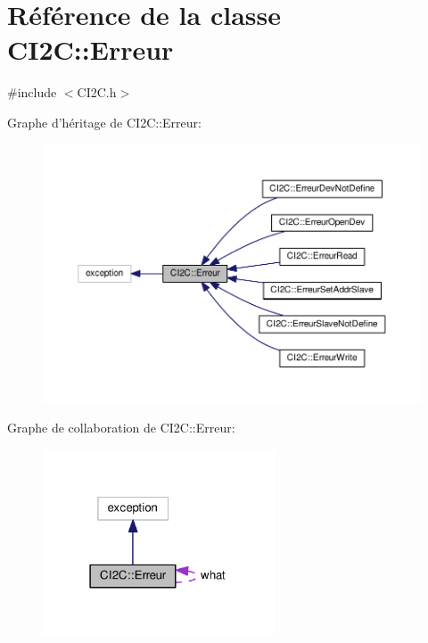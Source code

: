 \hypertarget{class_c_i2_c_1_1_erreur}{\section{Référence de la classe C\+I2\+C\+:\+:Erreur}
\label{class_c_i2_c_1_1_erreur}
}


{\ttfamily \#include $<$C\+I2\+C.\+h$>$}



Graphe d'héritage de C\+I2\+C\+:\+:Erreur\+:
\nopagebreak
\begin{figure}[H]
\begin{center}
\leavevmode
\includegraphics[width=350pt]{class_c_i2_c_1_1_erreur__inherit__graph}
\end{center}
\end{figure}


Graphe de collaboration de C\+I2\+C\+:\+:Erreur\+:
\nopagebreak
\begin{figure}[H]
\begin{center}
\leavevmode
\includegraphics[width=195pt]{class_c_i2_c_1_1_erreur__coll__graph}
\end{center}
\end{figure}
